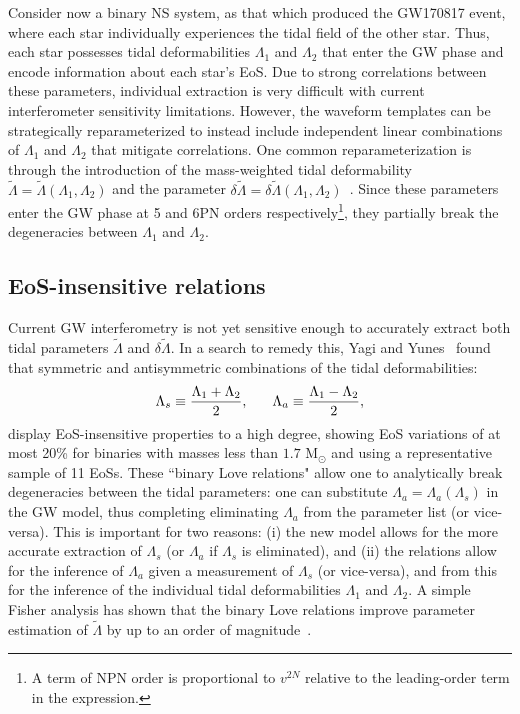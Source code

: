 \documentclass[prd,twocolumn,nofootinbib,superscriptaddress,amsmath,amssymb]{revtex4-1}
\begin{document}
Consider now a binary NS system, as that which produced the GW170817 event, where each star individually experiences the tidal field of the other star.
Thus, each star possesses tidal deformabilities $\Lambda_1$ and $\Lambda_2$ that enter the GW phase and encode information about each star's EoS.
Due to strong correlations between these parameters, individual extraction is very difficult with current interferometer sensitivity limitations.
However, the waveform templates can be strategically reparameterized to instead include independent linear combinations of $\Lambda_1$ and $\Lambda_2$ that mitigate correlations. One common reparameterization is through the introduction of the mass-weighted tidal deformability $\tilde{\Lambda}=\tilde{\Lambda}(\Lambda_1,\Lambda_2)$ and the parameter $\delta \tilde{\Lambda}=\delta \tilde{\Lambda}(\Lambda_1,\Lambda_2)$~\cite{Wade:tidalCorrections}. Since these parameters enter the GW phase at 5 and 6PN orders respectively\footnote{A term of NPN order is proportional to $v^{2N}$ relative to the leading-order term in the expression.}, they partially break the degeneracies between $\Lambda_{1}$ and $\Lambda_{2}$.

\subsection{EoS-insensitive relations}\label{sec:eosInsensitive}
Current GW interferometry is not yet sensitive enough to accurately extract both tidal parameters $\tilde{\Lambda}$ and $\delta\tilde{\Lambda}$.
In a search to remedy this, Yagi and Yunes~\cite{Yagi:binLove} found that symmetric and antisymmetric combinations of the tidal deformabilities:
\begin{equation}
\Lambda_s \equiv \frac{\Lambda_1 + \Lambda_2}{2}, \hspace{6mm} \Lambda_a \equiv \frac{\Lambda_1 - \Lambda_2}{2},
\end{equation}
display EoS-insensitive properties to a high degree, showing EoS variations of at most 20\% for binaries with masses less than $1.7 \text{ M}_{\odot}$ and using a representative sample of 11 EoSs. 
These ``binary Love relations" allow one to analytically break degeneracies between the tidal parameters: one can substitute $\Lambda_{a}=\Lambda_{a}(\Lambda_{s})$ in the GW model, thus completing eliminating $\Lambda_{a}$ from the parameter list (or vice-versa). This is important for two reasons: (i) the new model allows for the more accurate extraction of $\Lambda_{s}$ (or $\Lambda_{a}$ if $\Lambda_{s}$ is eliminated), and (ii) the relations allow for the inference of $\Lambda_{a}$ given a measurement of $\Lambda_{s}$ (or vice-versa), and from this for the inference of the individual tidal deformabilities $\Lambda_{1}$ and $\Lambda_{2}$. A simple Fisher analysis has shown that the binary Love relations improve parameter estimation of $\tilde{\Lambda}$ by up to an order of magnitude~\cite{Yagi:binLove}.
\end{document}
